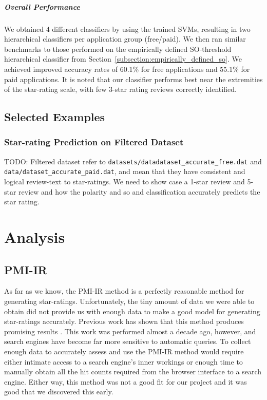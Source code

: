 \documentclass[11pt]{report} %
\begin{document}
\paragraph{Overall Performance}
We obtained 4 different classifiers by using the trained SVMs, resulting in two hierarchical classifiers per application group (free/paid). We then ran similar benchmarks to those performed on the empirically defined SO-threshold hierarchical classifier from Section~\ref{subsection:empirically_defined_so}. We achieved improved accuracy rates of 60.1\% for free applications and 55.1\% for paid applications. It is noted that our classifier performs best near the extremities of the star-rating scale, with few 3-star rating reviews correctly identified.

\section{Selected Examples}
\subsection{Star-rating Prediction on Filtered Dataset}
TODO: Filtered dataset refer to \verb|datasets/datadataset_accurate_free.dat| and \verb|data/dataset_accurate_paid.dat|, and mean that they have consistent and logical review-text to star-ratings. We need to show case a 1-star review and 5-star review and how the polarity and so and classification accurately predicts the star rating.

\chapter{Analysis}
	\section{PMI-IR}

As far as we know, the PMI-IR method is a perfectly reasonable method for generating star-ratings. Unfortunately, the tiny amount of data we were able to obtain did not provide us with enough data to make a good model for generating star-ratings accurately. Previous work has shown that this method produces promising results \cite{Turney2001}. This work was performed almost a decade ago, however, and search engines have become far more sensitive to automatic queries. To collect enough data to accurately assess and use the PMI-IR method would require either intimate access to a search engine's inner workings or enough time to manually obtain all the hit counts required from the browser interface to a search engine. Either way, this method was not a good fit for our project and it was good that we discovered this early.
\end{document}
